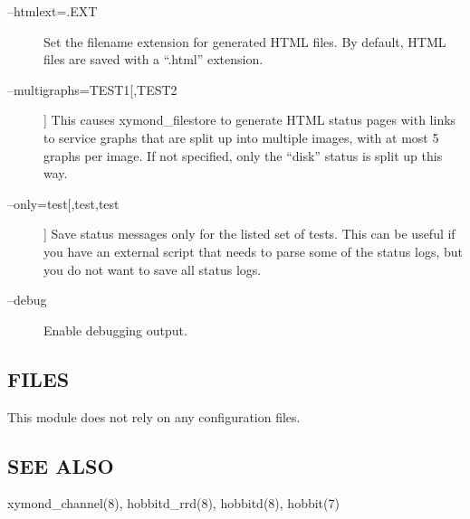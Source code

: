 \begin{description}
\item[--htmlext=.EXT] Set the filename extension for generated HTML files. By default, HTML files are saved with a ``.html'' extension. 

 

\item[--multigraphs=TEST1[,TEST2]] This causes xymond\_filestore to generate HTML status pages with links to service graphs that are split up into multiple images, with at most 5 graphs per image. If not specified, only the ``disk'' status is split up this way. 

 

\item[--only=test[,test,test]] Save status messages only for the listed set of tests. This can be useful if you have an external script that needs to parse some of the status logs, but you do not want to save all status logs. 

 

\item[--debug] Enable debugging output. 

 


\end{description}
\subsection{FILES}
 This module does not rely on any configuration files. 

 
\subsection{SEE ALSO}
xymond\_channel(8), hobbitd\_rrd(8), hobbitd(8), hobbit(7) 

 
